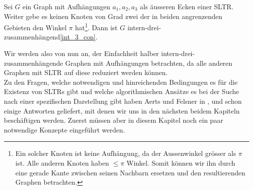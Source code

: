 \begin{proposition}
Sei $G$ ein Graph mit Aufhängungen $a_1,a_2,a_3$ als äusseren Ecken einer SLTR. Weiter gebe es keinen Knoten von Grad zwei der in beiden angrenzenden Gebieten den Winkel $\pi$ hat\footnote{Ein solcher Knoten ist keine Aufhängung, da der Aussenwinkel grösser als $\pi$ ist. Alle anderen Knoten haben $\leq\pi$ Winkel. Somit können wir ihn durch eine gerade Kante zwischen seinen Nachbarn ersetzen und den resultierenden Graphen betrachten.}. Dann ist $G$ intern-drei-zusammenhängend\ref{int_3_con}.
\end{proposition}


Wir werden also von nun an, der Einfachheit halber intern-drei-zusammenhängende Graphen mit Aufhängungen betrachten, da alle anderen Graphen mit SLTR auf diese reduziert werden können. \\

Zu den Fragen, welche notwendigen und hinreichenden Bedingungen es für die Existenz von SLTRs gibt und  welche algorithmischen Ansätze es bei der Suche nach einer spezifischen Darstellung gibt haben Aerts und Felsner in \cite{af13}, \cite{af13h} und \cite{af15} schon einige Antworten geliefert, mit denen wir uns in den nächsten beidem Kapiteln beschäftigen werden. Zuerst müssen aber in diesem Kapitel noch ein paar notwendige Konzepte eingeführt werden.
